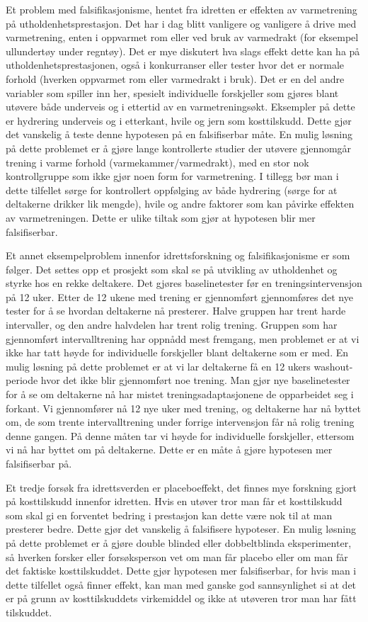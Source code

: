 \documentclass[
  letterpaper,
  DIV=11,
  numbers=noendperiod]{scrreprt}
\begin{document}
Et problem med falsifikasjonisme, hentet fra idretten er effekten av
varmetrening på utholdenhetsprestasjon. Det har i dag blitt vanligere og
vanligere å drive med varmetrening, enten i oppvarmet rom eller ved bruk
av varmedrakt (for eksempel ullundertøy under regntøy). Det er mye
diskutert hva slags effekt dette kan ha på utholdenhetsprestasjonen,
også i konkurranser eller tester hvor det er normale forhold (hverken
oppvarmet rom eller varmedrakt i bruk). Det er en del andre variabler
som spiller inn her, spesielt individuelle forskjeller som gjøres blant
utøvere både underveis og i ettertid av en varmetreningsøkt. Eksempler
på dette er hydrering underveis og i etterkant, hvile og jern som
kosttilskudd. Dette gjør det vanskelig å teste denne hypotesen på en
falsifiserbar måte. En mulig løsning på dette problemet er å gjøre lange
kontrollerte studier der utøvere gjennomgår trening i varme forhold
(varmekammer/varmedrakt), med en stor nok kontrollgruppe som ikke gjør
noen form for varmetrening. I tillegg bør man i dette tilfellet sørge
for kontrollert oppfølging av både hydrering (sørge for at deltakerne
drikker lik mengde), hvile og andre faktorer som kan påvirke effekten av
varmetreningen. Dette er ulike tiltak som gjør at hypotesen blir mer
falsifiserbar.

Et annet eksempelproblem innenfor idrettsforskning og falsifikasjonisme
er som følger. Det settes opp et prosjekt som skal se på utvikling av
utholdenhet og styrke hos en rekke deltakere. Det gjøres baselinetester
før en treningsintervensjon på 12 uker. Etter de 12 ukene med trening er
gjennomført gjennomføres det nye tester for å se hvordan deltakerne nå
presterer. Halve gruppen har trent harde intervaller, og den andre
halvdelen har trent rolig trening. Gruppen som har gjennomført
intervalltrening har oppnådd mest fremgang, men problemet er at vi ikke
har tatt høyde for individuelle forskjeller blant deltakerne som er med.
En mulig løsning på dette problemet er at vi lar deltakerne få en 12
ukers washout-periode hvor det ikke blir gjennomført noe trening. Man
gjør nye baselinetester for å se om deltakerne nå har mistet
treningsadaptasjonene de opparbeidet seg i forkant. Vi gjennomfører nå
12 nye uker med trening, og deltakerne har nå byttet om, de som trente
intervalltrening under forrige intervensjon får nå rolig trening denne
gangen. På denne måten tar vi høyde for individuelle forskjeller,
ettersom vi nå har byttet om på deltakerne. Dette er en måte å gjøre
hypotesen mer falsifiserbar på.

Et tredje forsøk fra idrettsverden er placeboeffekt, det finnes mye
forskning gjort på kosttilskudd innenfor idretten. Hvis en utøver tror
man får et kosttilskudd som skal gi en forventet bedring i prestasjon
kan dette være nok til at man presterer bedre. Dette gjør det vanskelig
å falsifisere hypoteser. En mulig løsning på dette problemet er å gjøre
double blinded eller dobbeltblinda eksperimenter, så hverken forsker
eller forsøksperson vet om man får placebo eller om man får det faktiske
kosttilskuddet. Dette gjør hypotesen mer falsifiserbar, for hvis man i
dette tilfellet også finner effekt, kan man med ganske god sannsynlighet
si at det er på grunn av kosttilskuddets virkemiddel og ikke at utøveren
tror man har fått tilskuddet.
\end{document}
